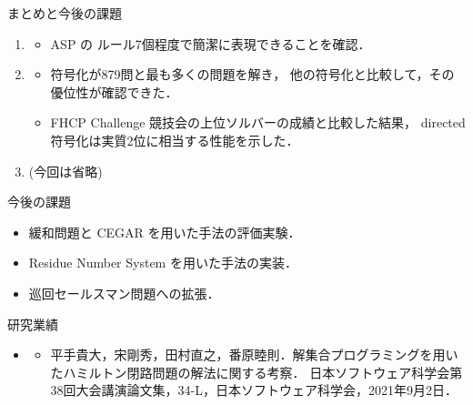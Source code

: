 \documentclass[dvipdfmx]{beamer}
\begin{document}
\begin{frame}{まとめと今後の課題}

\begin{enumerate}
\item {}
  \begin{itemize}
  \item ASP の \alert{ルール7個}程度で簡潔に表現できることを確認．
  \end{itemize}
\item {}
  \begin{itemize}
  \item {} 符号化が879問と最も多くの問題を解き，
    他の符号化と比較して，その優位性が確認できた．
  \item FHCP Challenge 競技会の上位ソルバーの成績と比較した結果，
    directed 符号化は\alert{実質2位}に相当する性能を示した．
  \end{itemize}
\item {} (今回は省略)
\end{enumerate}

\begin{block}{今後の課題}
  \begin{itemize}
  \item 緩和問題と CEGAR を用いた手法の評価実験．
  \item Residue Number System を用いた手法の実装．
  \item 巡回セールスマン問題への拡張．
  \end{itemize}
\end{block}
\end{frame}

\begin{frame}{ 研究業績}
\begin{itemize}
 \item {}
 \begin{itemize}
  \item 平手貴大，宋剛秀，田村直之，番原睦則．解集合プログラミングを用いたハミルトン閉路問題の解法に関する考察．
         日本ソフトウェア科学会第38回大会講演論文集，34-L，日本ソフトウェア科学会，2021年9月2日．
 \end{itemize}
\end{itemize}
\end{frame}
\end{document}
